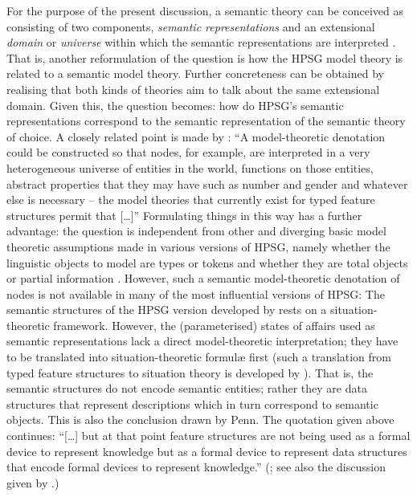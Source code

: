 \documentclass[output=paper]{langsci/langscibook}
\begin{document}
{For the purpose of the present discussion, a semantic theory can be conceived as consisting of two components, \emph{semantic representations} and an extensional \emph{domain}  or \emph{universe}  within which the semantic representations are interpreted \citep{Zimmermann:2011:a,Kempson:2011}. 
%
That is, another reformulation of the question is how the HPSG model theory is related to a semantic model theory.
%
Further concreteness can be obtained by realising that both kinds of theories aim to talk about the same extensional domain. %
%
 Given this, the question becomes:  how do HPSG's semantic representations correspond to the semantic representation of the semantic theory of choice.
%
A closely related point is made by \citet[]{Penn:2000}: \enquote{A model-theoretic denotation could be constructed so that nodes, for example, are interpreted in a very heterogeneous universe of entities in the world, functions on those entities, abstract properties that they may have such as number and gender and whatever else is necessary -- the model theories that currently exist for typed feature structures permit that [\ldots]}
%
Formulating things in  this way has a further advantage: the question is independent from other and diverging basic model theoretic assumptions made in various versions of HPSG, namely whether the linguistic objects to model are types \citep{Pollard:Sag:1994} or tokens \citep{Pollard:Sag:1987} and whether they are total objects \citep{Pollard:Sag:1994} or partial information \citep{Carpenter:1992}.
%
However, such a semantic model-theoretic denotation of nodes is not available in many of the most influential versions of HPSG:
The semantic structures of the HPSG version developed by \citet{Pollard:Sag:1994} rests on a situation-theoretic framework. 
%
However, the (parameterised) states of affairs used as semantic representations lack a direct model-theoretic interpretation; they have to be translated into  situation-theoretic formul{\ae} first (such a translation from typed feature structures to situation theory is developed by \citealp{Ginzburg:Sag:2000}).
%
That is, the semantic structures do not encode semantic entities; rather they are data structures that represent descriptions which in turn correspond to semantic objects.
%
This is also the conclusion drawn by Penn.
%
The quotation given above continues: \enquote{[\ldots] but at that point feature structures are not being used as a formal device to represent knowledge but as a formal device to represent data structures that encode formal devices to represent knowledge.} (\citet[]{Penn:2000}; see also the discussion given by \citet[Sec.~5.2.2]{Ginzburg:2012}.)



}
\end{document}
